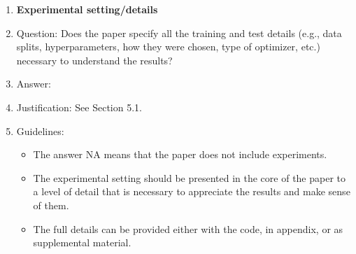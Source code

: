 \documentclass{article}
\theoremstyle{plain}
\theoremstyle{definition}
\theoremstyle{remark}
\begin{document}
\begin{enumerate}
\item {\bf Experimental setting/details}
    \item[] Question: Does the paper specify all the training and test details (e.g., data splits, hyperparameters, how they were chosen, type of optimizer, etc.) necessary to understand the results?
    \item[] Answer: \answerYes{} %
    \item[] Justification: See Section 5.1.
    \item[] Guidelines:
    \begin{itemize}
        \item The answer NA means that the paper does not include experiments.
        \item The experimental setting should be presented in the core of the paper to a level of detail that is necessary to appreciate the results and make sense of them.
        \item The full details can be provided either with the code, in appendix, or as supplemental material.
    \end{itemize}


\end{enumerate}
\end{document}
